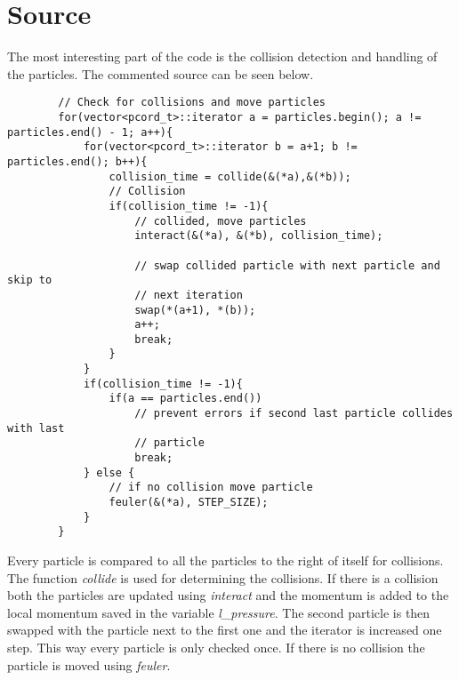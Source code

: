 \documentclass[a4paper, 12pt]{article}
\begin{document}
\section{Source}
\label{sec:src}
The most interesting part of the code is the collision detection and handling of
the particles. The commented source can be seen below.
\begin{lstlisting}
        // Check for collisions and move particles
        for(vector<pcord_t>::iterator a = particles.begin(); a != particles.end() - 1; a++){
            for(vector<pcord_t>::iterator b = a+1; b != particles.end(); b++){
                collision_time = collide(&(*a),&(*b));
                // Collision
                if(collision_time != -1){
                    // collided, move particles
                    interact(&(*a), &(*b), collision_time);

                    // swap collided particle with next particle and skip to
                    // next iteration
                    swap(*(a+1), *(b));
                    a++;
                    break;
                }
            }
            if(collision_time != -1){
                if(a == particles.end())
                    // prevent errors if second last particle collides with last
                    // particle
                    break;
            } else {
                // if no collision move particle
                feuler(&(*a), STEP_SIZE);
            }
        }
\end{lstlisting}

Every particle is compared to all the particles to the right of itself for
collisions. The function \textit{collide} is used for determining the
collisions. If there is a collision both the particles are updated using
\textit{interact} and the momentum is added to the local momentum saved in the
variable \textit{l\_pressure}. The second particle is then swapped with the
particle next to the first one and the iterator is increased one step. This way
every particle is only checked once. If there is no collision the particle is
moved using \textit{feuler}.

\newpage
\appendix
\end{document}
